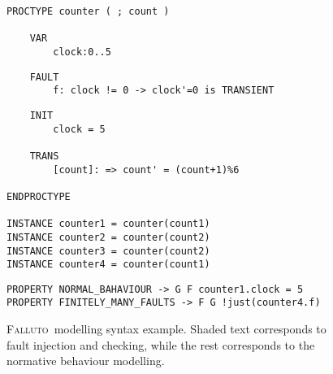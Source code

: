 \documentclass[12pt]{llncs2e/llncs}
\newcommand{\falluto}{\mbox{\textsc{Falluto}}}
\newcommand{\fallutoSp}{\mbox{\textsc{Falluto~}}}
\begin{document}
\begin{figure}[H]
    \centering
\begin{framed}
\begin{verbatim}
PROCTYPE counter ( ; count )

    VAR
        clock:0..5
\end{verbatim}
\vspace{-0.5cm}
\begin{shaded}
\vspace{-0.5cm}
\begin{verbatim}
    FAULT
        f: clock != 0 -> clock'=0 is TRANSIENT
\end{verbatim}
\vspace{-0.5cm}
\end{shaded}
\vspace{-0.5cm}
\begin{verbatim}
    INIT
        clock = 5

    TRANS
        [count]: => count' = (count+1)%6

ENDPROCTYPE

INSTANCE counter1 = counter(count1)
INSTANCE counter2 = counter(count2)
INSTANCE counter3 = counter(count2)
INSTANCE counter4 = counter(count1)
\end{verbatim}
\vspace{-0.5cm}
\begin{shaded}
\vspace{-0.5cm}
\begin{verbatim}
PROPERTY NORMAL_BAHAVIOUR -> G F counter1.clock = 5
PROPERTY FINITELY_MANY_FAULTS -> F G !just(counter4.f)
\end{verbatim}
\vspace{-0.5cm}
\end{shaded}
\vspace{-0.5cm}
\end{framed}
    \caption{\fallutoSp modelling syntax example. Shaded text corresponds to fault injection and checking, while the rest corresponds to the normative behaviour modelling.}
\label{example}

\end{figure}


%
%
%
%
%
%
%
\end{document}
